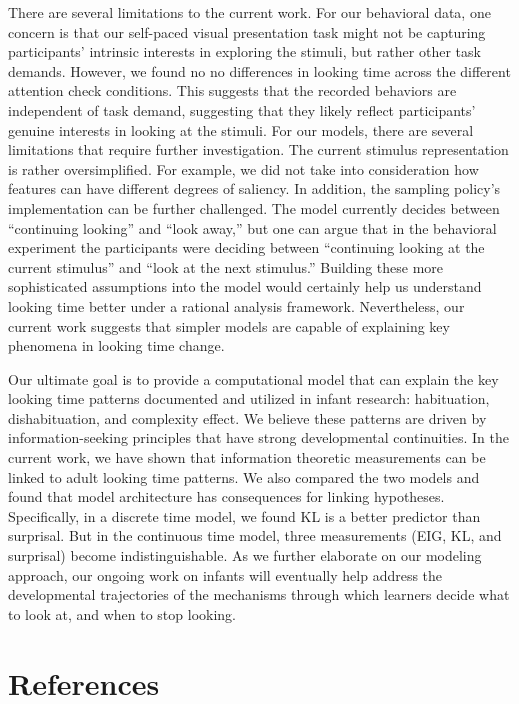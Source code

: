 \documentclass[10pt, letterpaper]{article}
\begin{document}
There are several limitations to the current work. For our behavioral
data, one concern is that our self-paced visual presentation task might
not be capturing participants' intrinsic interests in exploring the
stimuli, but rather other task demands. However, we found no no
differences in looking time across the different attention check
conditions. This suggests that the recorded behaviors are independent of
task demand, suggesting that they likely reflect participants' genuine
interests in looking at the stimuli. For our models, there are several
limitations that require further investigation. The current stimulus
representation is rather oversimplified. For example, we did not take
into consideration how features can have different degrees of saliency.
In addition, the sampling policy's implementation can be further
challenged. The model currently decides between ``continuing looking''
and ``look away,'' but one can argue that in the behavioral experiment
the participants were deciding between ``continuing looking at the
current stimulus'' and ``look at the next stimulus.'' Building these
more sophisticated assumptions into the model would certainly help us
understand looking time better under a rational analysis framework.
Nevertheless, our current work suggests that simpler models are capable
of explaining key phenomena in looking time change.

Our ultimate goal is to provide a computational model that can explain
the key looking time patterns documented and utilized in infant
research: habituation, dishabituation, and complexity effect. We believe
these patterns are driven by information-seeking principles that have
strong developmental continuities. In the current work, we have shown
that information theoretic measurements can be linked to adult looking
time patterns. We also compared the two models and found that model
architecture has consequences for linking hypotheses. Specifically, in a
discrete time model, we found KL is a better predictor than surprisal.
But in the continuous time model, three measurements (EIG, KL, and
surprisal) become indistinguishable. As we further elaborate on our
modeling approach, our ongoing work on infants will eventually help
address the developmental trajectories of the mechanisms through which
learners decide what to look at, and when to stop looking.

\hypertarget{references}{%
\section{References}\label{references}}
\end{document}
